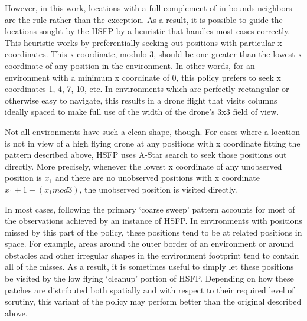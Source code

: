 However, in this work, locations with a full complement of in-bounds neighbors are the rule rather than the exception. As a result, it is possible to guide the locations sought by the HSFP by a heuristic that handles most cases correctly. This heuristic works by preferentially seeking out positions with particular x coordinates. This x coordinate, modulo 3, should be one greater than the lowest x coordinate of any position in the environment. In other words, for an environment with a minimum x coordinate of 0, this policy prefers to seek x coordinates 1, 4, 7, 10, etc. In environments which are perfectly rectangular or otherwise easy to navigate, this results in a drone flight that visits columns ideally spaced to make full use of the width of the drone's 3x3 field of view.

Not all environments have such a clean shape, though. For cases where a location is not in view of a high flying drone at any positions with x coordinate fitting the pattern described above, HSFP uses A-Star search to seek those positions out directly. More precisely, whenever the lowest x coordinate of any unobserved position is $x_1$ and there are no unobserved positions with x coordinate $x_1 + 1 - (x_1 mod 3)$, the unobserved position is visited directly. 

In most cases, following the primary `coarse sweep' pattern accounts for most of the observations achieved by an instance of HSFP. In environments with positions missed by this part of the policy, these positions tend to be at related positions in space. For example, areas around the outer border of an environment or around obstacles and other irregular shapes in the environment footprint tend to contain all of the misses. As a result, it is sometimes useful to simply let these positions be visited by the low flying `cleanup' portion of HSFP. Depending on how these patches are distributed both spatially and with respect to their required level of scrutiny, this variant of the policy may perform better than the original described above.